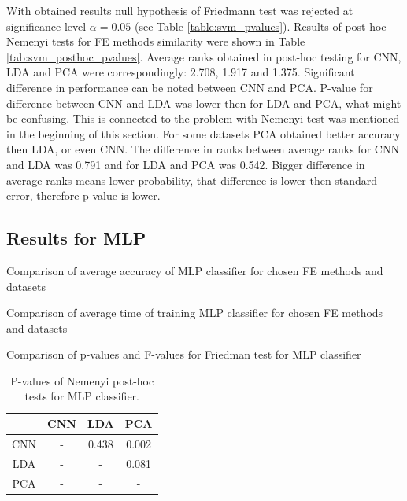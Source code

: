 \documentclass[a4paper, 10 pt, conference]{ieeeconf}
\begin{document}
\newpage

With obtained results null hypothesis of Friedmann test was rejected at significance level $\alpha = 0.05$ (see Table \ref{table:svm_pvalues}). 
Results of post-hoc Nemenyi tests for FE methods similarity were shown in Table \ref{tab:svm_posthoc_pvalues}. 
Average ranks obtained in post-hoc testing for CNN, LDA and PCA were correspondingly: 2.708, 1.917 and 1.375.
Significant difference in performance can be noted between CNN and PCA.
P-value for difference between CNN and LDA was lower then for LDA and PCA, what might be confusing. This is connected to the problem with Nemenyi test was mentioned in the beginning of this section. For some datasets PCA obtained better accuracy then LDA, or even CNN. The difference in ranks between average ranks for CNN and LDA was 0.791 and for LDA and PCA was 0.542. Bigger difference in average ranks means lower probability, that difference is lower then standard error, therefore p-value is lower. 

\newpage

\subsection{Results for MLP}


\begin{table}[!h]
    \centering
    \caption{Comparison of average accuracy of MLP classifier for chosen FE methods and datasets}
    
    \label{table:NN_acc_comparison}
\end{table}

\begin{table}[!h]
    \centering
    \caption{Comparison of average time of training MLP classifier for chosen FE methods and datasets}
    
    \label{table:NN_fit_time_comparison}
\end{table}

\begin{table}[!h]
    \centering
    \caption{Comparison of p-values and F-values for Friedman test for MLP classifier}
    
    \label{table:NN_pvalues}
\end{table}

\begin{table}[!h]
    \centering
    \caption{P-values of Nemenyi post-hoc tests for MLP classifier.}
    \begin{tabular}{|c|c|c|c|}
         \hline
          & CNN & LDA & PCA \\
         \hline
         CNN &  - &  0.438 &  0.002 \\
         \hline
         LDA &  - & - &  0.081 \\
         \hline
         PCA &  - & - & - \\
         \hline
    \end{tabular}
    \label{tab:NN_posthoc_pvalues}
\end{table}
\end{document}
